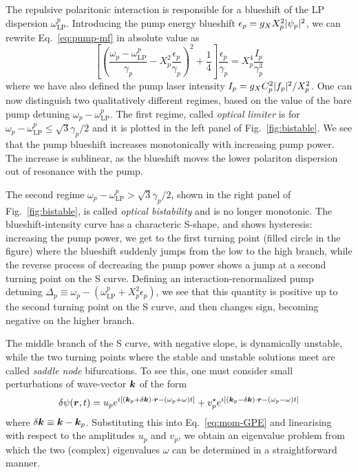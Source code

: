 The repulsive polaritonic interaction is responsible for a blueshift
of the LP dispersion $\omega_{\text{LP}}^{p}$.  Introducing the pump energy blueshift
$\epsilon_p = g_X X_p^2 \vert \psi_p \vert^2$, we can rewrite
Eq.~\eqref{eq:pump-mf} in absolute value as
%
\begin{equation}\label{eq:pump-mf-sq}
  \left[\left(\frac{\omega_p-\omega^p_{\text{LP}}}{\gamma_p} - X_p^2 \frac{\epsilon_p}{\gamma_p}\right)^2 + \frac{1}{4} \right] \frac{\epsilon_p}{\gamma_p} = X_p^4 \frac{I_p}{\gamma_p^3}
\end{equation}
%
where we have also defined the pump laser intensity
$I_p = g_X C_p^2 \vert f_p \vert^2/X_p^2$. One can now distinguish two
qualitatively different regimes, based on the value of the bare pump
detuning $\omega_p-\omega^p_{\text{LP}}$. The first regime, called
\textit{optical limiter} is for
$\omega_p-\omega^p_{\text{LP}} \leq \sqrt{3}\gamma_p/2$ and it is
plotted in the left panel of Fig.~\ref{fig:bistable}. We see that the
pump blueshift increases monotonically with increasing pump power. The
increase is sublinear, as the blueshift moves the lower polariton
dispersion out of resonance with the pump.

The second regime
$\omega_p-\omega^p_{\text{LP}} > \sqrt{3}\gamma_p/2$, shown in the
right panel of Fig.~\ref{fig:bistable}, is called \textit{optical
  bistability} and is no longer monotonic. The blueshift-intensity
curve has a characteric S-shape, and shows hysteresis: increasing the
pump power, we get to the first turning point (filled circle in the
figure) where the blueshift suddenly jumps from the low to the high
branch, while the reverse process of decreasing the pump power shows a
jump at a second turning point on the S curve. Defining an
interaction-renormalized pump detuning
$\Delta_p \equiv \omega_p-(\omega^p_{\text{LP}} + X_p^2\epsilon_p)$,
we see that this quantity is positive up to the second turning point
on the S curve, and then changes sign, becoming negative on the higher
branch.

The middle branch of the S curve, with negative slope, is dynamically
unstable, while the two turning points where the stable and unstable
solutions meet are called \textit{saddle node} bifurcations.  To see
this, one must consider small perturbations of wave-vector $\bm{k}$ of
the form
%
\begin{equation}\label{eq:pump-fluctuations}
  \delta \psi(\bm{r},t) =  u_p e^{i [(\bm{k}_p + \delta\bm{k}) \cdot \bm{r} - (\omega_p + \omega) t ]}  + v_p^{\star}e^{i[ (\bm{k}_p - \delta\bm{k}) \cdot \bm{r}- (\omega_p - \omega) t]}
\end{equation}
% 
where $\delta\bm{k} \equiv \bm{k} - \bm{k}_p$. Substituting this into
Eq.~\eqref{eq:mom-GPE} and linearising with respect to the amplitudes
$u_p$ and $v_p$, we obtain an eigenvalue problem from which the two
(complex) eigenvalues $\omega$ can be determined in a straightforward
manner. 

